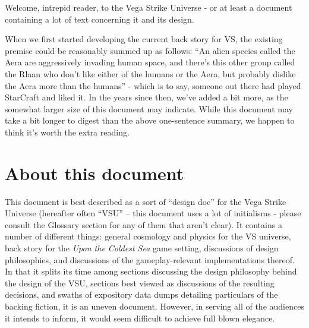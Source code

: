 Welcome, intrepid reader, to the Vega Strike Universe - or at least a
document containing a lot of text concerning it and its design.

When we first started developing the current back story for VS, the
existing premise could be reasonably summed up as follows: ``An alien
species called the Aera are aggressively invading human space, and
there's this other group called the Rlaan who don't like either of the
humans or the Aera, but probably dislike the Aera more than the
humans'' - which is to say, someone out there had played StarCraft and
liked it. In the years since then, we've added a bit more, as the
somewhat larger size of this document may indicate. While this
document may take a bit longer to digest than the above one-sentence
summary, we happen to think it's worth the extra reading.

\section*{About this document}
This document is best described as a sort of ``design doc'' for the Vega
Strike Universe (hereafter often ``VSU'' -- this document uses a lot
of initialisms - please consult the Glossary section for any of them
that aren't clear). It contains a number of different things: general
cosmology and physics for the VS universe, back story for the {\it
Upon the Coldest Sea} game setting, discussions of design
philosophies, and discussions of the gameplay-relevant implementations thereof. In that
it splits its time among sections discussing the design philosophy
behind the design of the VSU, sections best viewed as discussions of
the resulting decisions, and swaths of expository data dumps detailing
particulars of the backing fiction, it is an uneven document. However,
in serving all of the audiences it intends to inform, it would seem
difficult to achieve full blown elegance.

